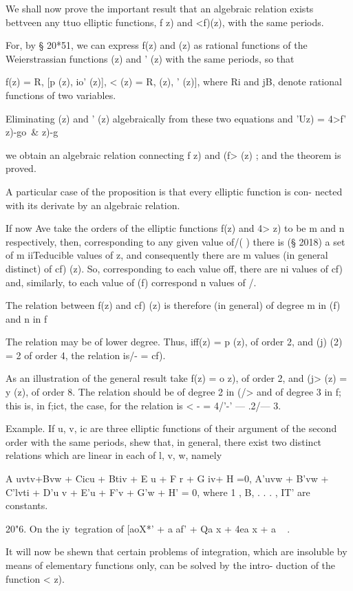 {We shall now prove the important result that an algebraic relation exists 
bettveen any ttuo elliptic functions, f z) and <f)(z), with the same periods. 

For, by § 20*51, we can express f(z) and   (z) as rational functions of the 
Weierstrassian functions   (z) and  ' (z) with the same periods, so that 

f(z) = R, [p (z), io' (z)], <  (z) = R,    (z),  ' (z)], 
where Ri and jB, denote rational functions of two variables. 

Eliminating   (z) and  ' (z) algebraically from these two equations and 
 'Uz) = 4>f' z)-go\ \& z)-g  

we obtain an algebraic relation connecting f z) and (f> (z) ; and the theorem 
is proved. 

A particular case of the proposition is that every elliptic function is con- 
nected with its derivate by an algebraic relation. 

If now Ave take the orders of the elliptic functions f(z) and 4> z) to be m 
and n respectively, then, corresponding to any given value of/( ) there is 
(§ 2018) a set of m iiTeducible values of z, and consequently there are m 
values (in general distinct) of cf) (z). So, corresponding to each value off, there 
are ni values of cf) and, similarly, to each value of (f) correspond n values of /. 

The relation between f(z) and cf) (z) is therefore (in general) of degree m 
in (f) and n in f 

The relation may be of lower degree. Thus, iff(z) = p (z), of order 2, and 
(j) (2) =  2    of order 4, the relation is/- = cf). 

As an illustration of the general result take f(z) =  o z), of order 2, and 
(j> (z) =  y (z), of order 8. The relation should be of degree 2 in (/> and of 
degree 3 in f; this is, in f;ict, the case, for the relation is < - = 4/'-' —  .2/—  3. 

Example. If u, v, ic are three elliptic functions of their argument of the second order 
with the same periods, shew that, in general, there exist two distinct relations which are 
  linear in each of  l, v, w, namely 

A uvtv+Bvw + Cicu + Btiv + E u + F r + G iv+ H =0, 
A'uvw + B'vw + C'lvti + D'u v + E'u + F'v + G'w + H' = 0, 
where  1 , B, . . . , IT' are constants. 

20"6. On the iy\ tegration of [aoX*' +  a af' + Qa x  + 4ea x + a  ~ . 

It will now be shewn that certain problems of integration, which are 
insoluble by means of elementary functions only, can be solved by the intro- 
duction of the function <   z). 



}
